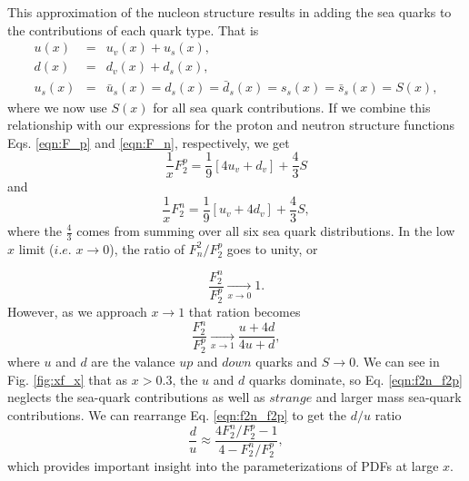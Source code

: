 This approximation of the nucleon structure results in adding the sea quarks to the contributions of each quark type. That is
\begin{eqnarray}
\nonumber
u(x) &=& u_v(x) + u_s(x), \\
d(x) &=& d_v(x) + d_s(x), \\
u_s(x) &=& \bar{u}_s(x) = d_s(x) = \bar{d}_s(x) = s_s(x) = \bar{s}_s(x) = S(x),
\end{eqnarray}
where we now use $S(x)$ for all sea quark contributions. If we combine this relationship with our expressions for the proton and neutron structure functions Eqs. \ref{eqn:F_p} and \ref{eqn:F_n}, respectively, we get
\begin{equation}
\frac{1}{x} F_2^p = \frac{1}{9}[4u_v + d_v] + \frac{4}{3} S
\end{equation}
and 
\begin{equation}
\frac{1}{x} F_2^n = \frac{1}{9}[u_v + 4d_v] + \frac{4}{3} S,
\end{equation}
where the $\tfrac{4}{3}$ comes from summing over all six sea quark distributions. In the low $x$ limit ($i.e.$ $x \rightarrow 0$), the ratio of $F_n^2/F_2^p$ goes to unity, or

\begin{equation}
\frac{F_2^n}{F_2^p} \xrightarrow[\text{$x \rightarrow 0$}]{} 1.
\end{equation}
However, as we approach $x \rightarrow 1$ that ration becomes
\begin{equation}
\label{eqn:f2n_f2p}
\frac{F_2^n}{F_2^p} \xrightarrow[\text{$x \rightarrow 1$}]{} \frac{u+4d}{4u+d},
\end{equation}
where $u$ and $d$ are the valance $up$ and $down$ quarks and $S\rightarrow0$. We can see in Fig. \ref{fig:xf_x} that as $x>0.3$, the $u$ and $d$ quarks dominate, so Eq. \ref{eqn:f2n_f2p} neglects the sea-quark contributions as well as $strange$ and larger mass sea-quark contributions. We can rearrange Eq. \ref{eqn:f2n_f2p} to get the $d/u$ ratio
\begin{equation}
\label{eqn:d/u}
\frac{d}{u} \approx \frac{4F_2^n/F_2^p-1}{4 - F_2^n/F_2^p},
\end{equation}
which provides important insight into the parameterizations of PDFs at large $x$.

